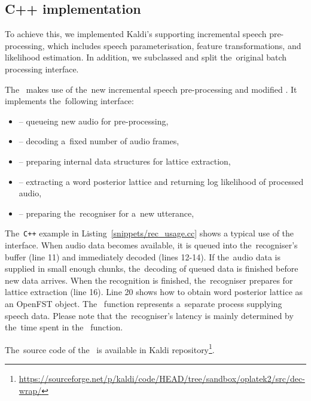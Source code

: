 \subsection{C++ implementation}
\label{sub:verb_c_}

To achieve this, we implemented Kaldi's  supporting incremental speech pre-processing, which includes speech parameterisation, feature transformations, and likelihood estimation.
In addition, we subclassed  and split the~original batch processing interface.

The~ makes use of the~new incremental speech pre-processing and modified .
It implements the~following interface:
\begin{itemize}
\item {} -- queueing new audio for pre-processing,
\item {} -- decoding a~fixed number of audio frames,
\item {} -- preparing internal data structures for lattice extraction,
\item {} -- extracting a word posterior lattice and returning log likelihood of processed audio,
\item {} -- preparing the~recogniser for a~new utterance,
\end{itemize}

The~\verb!C++! example in Listing~\ref{snippets/rec_usage.cc} shows a typical use of the~ interface.
When audio data becomes available, it is queued into the~recogniser's buffer (line 11) and immediately decoded (lines 12-14).
If the~audio data is supplied in small enough chunks, the~decoding of queued data is finished before new data arrives.
When the recognition is finished, the~recogniser prepares for lattice extraction (line 16).
Line 20 shows how to obtain word posterior lattice as an OpenFST object.
The~ function represents a~separate process supplying speech data.
Please note that the~recogniser's latency is mainly determined by the~time spent in the~ function.


The~source code of the~ is available in Kaldi repository\footnote{\url{https://sourceforge.net/p/kaldi/code/HEAD/tree/sandbox/oplatek2/src/dec-wrap/}}.

